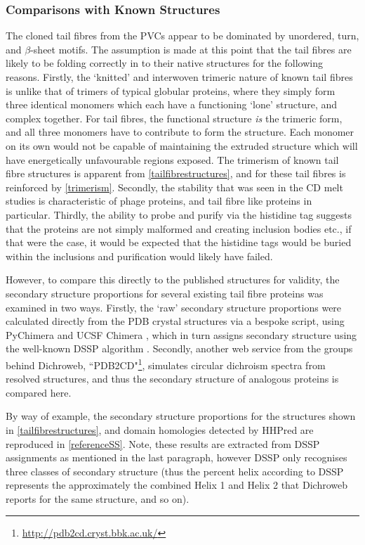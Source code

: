 \subsubsection{Comparisons with Known Structures}\label{comparisons}
The cloned tail fibres from the PVCs appear to be dominated by unordered, turn, and $\beta$-sheet motifs. The assumption is made at this point that the tail fibres are likely to be folding correctly in to their native structures for the following reasons. Firstly, the `knitted' and interwoven trimeric nature of known tail fibres is unlike that of trimers of typical globular proteins, where they simply form three identical monomers which each have a functioning `lone' structure, and complex together. For tail fibres, the functional structure \emph{is} the trimeric form, and all three monomers have to contribute to form the structure. Each monomer on its own would not be capable of maintaining the extruded structure which will have energetically unfavourable regions exposed. The trimerism of known tail fibre structures is apparent from \vref{tailfibrestructures}, and for these tail fibres is reinforced by \vref{trimerism}. Secondly, the stability that was seen in the CD melt studies is characteristic of phage proteins, and tail fibre like proteins in particular. Thirdly, the ability to probe and purify via the histidine tag suggests that the proteins are not simply malformed and creating inclusion bodies etc., if that were the case, it would be expected that the histidine tags would be buried within the inclusions and purification would likely have failed.

However, to compare this directly to the published structures for validity, the secondary structure proportions for several existing tail fibre proteins was examined in two ways. Firstly, the `raw' secondary structure proportions were calculated directly from the PDB crystal structures via a bespoke script, using PyChimera \citep{Rodriguez-GuerraPedregal2018} and UCSF Chimera \citep{Pettersen2004}, which in turn assigns secondary structure using the well-known DSSP algorithm \citep{Kabsch1983}. Secondly, another web service from the groups behind Dichroweb, ``PDB2CD"\footnote{\url{http://pdb2cd.cryst.bbk.ac.uk/}}, simulates circular dichroism spectra from resolved structures, and thus the secondary structure of analogous proteins is compared here.

By way of example, the secondary structure proportions for the structures shown in \vref{tailfibrestructures}, and domain homologies detected by HHPred are reproduced in \vref{referenceSS}. Note, these results are extracted from DSSP assignments as mentioned in the last paragraph, however DSSP only recognises three classes of secondary structure (thus the percent helix according to DSSP represents the approximately the combined Helix 1 and Helix 2 that Dichroweb reports for the same structure, and so on).



